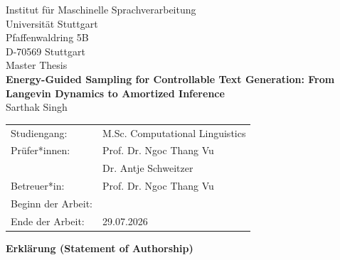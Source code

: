 \documentclass[12pt,leqno,a4paper]{report}
\begin{document}
\thispagestyle{empty}
\begin{center}
    {\large Institut f\"ur Maschinelle Sprachverarbeitung}\\
    {\large Universit\"at Stuttgart}\\
    {\large Pfaffenwaldring 5B}\\
    {\large D-70569 Stuttgart}\\[3cm]

    {\large Master Thesis}\\[1.2cm]

    {\LARGE\bfseries Energy-Guided Sampling for Controllable Text Generation: From Langevin Dynamics to Amortized Inference}\\[2cm]

    {\large Sarthak Singh}\\[1.5cm]

    \begin{tabular}{ll}
        Studiengang: & M.Sc. Computational Linguistics\\[0.5cm]
        Pr\"ufer*innen: & Prof. Dr. Ngoc Thang Vu\\
                        & Dr. Antje Schweitzer\\[0.5cm]
        Betreuer*in: & Prof. Dr. Ngoc Thang Vu\\[0.9cm]
        Beginn der Arbeit: & \\ %
        Ende der Arbeit: & 29.07.2026\\
    \end{tabular}
\end{center}
\clearpage

\thispagestyle{empty}
\noindent\textbf{Erkl\"arung (Statement of Authorship)}\\[0.4cm]
\end{document}
